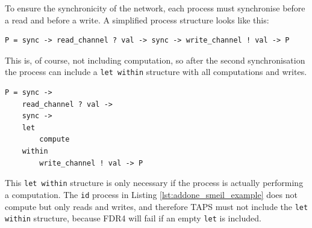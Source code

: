 To ensure the synchronicity of the network, each process must synchronise before a read and before a write. A simplified process structure looks like this:
\begin{verbatim}
P = sync -> read_channel ? val -> sync -> write_channel ! val -> P
\end{verbatim}
This is, of course, not including computation, so after the second synchronisation the process can include a \texttt{let within} structure with all computations and writes.
\begin{verbatim}
P = sync ->
    read_channel ? val ->
    sync ->
    let
        compute
    within
        write_channel ! val -> P
\end{verbatim}
This \texttt{let within} structure is only necessary if the process is actually performing a computation. The \texttt{id} process in Listing \ref{lst:addone_smeil_example} does not compute but only reads and writes, and therefore TAPS must not include the \texttt{let within} structure, because FDR4 will fail if an empty \texttt{let} is included. \\

